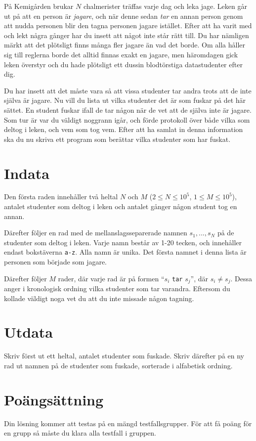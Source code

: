 På Kemigården brukar $N$ chalmerister träffas varje dag och leka jage.
Leken går ut på att en person är \emph{jagare}, 
och när denne sedan \emph{tar} en annan person genom att nudda personen blir den tagna personen jagare istället.
Efter att ha varit med och lekt några gånger har du insett att något inte står rätt till.
Du har nämligen märkt att det plötsligt finns många fler jagare än vad det borde.
Om alla håller sig till reglerna borde det alltid finnas exakt en jagare,
men häromdagen gick leken överstyr och du hade plötsligt ett dussin blodtörstiga datastudenter efter dig.

Du har insett att det måste vara så att vissa studenter tar andra trots att de inte själva är jagare.
Nu vill du lista ut vilka studenter det är som fuskar på det här sättet.
En student fuskar ifall de tar någon när de vet att de själva inte är jagare.
Som tur är var du väldigt noggrann igår, och förde protokoll över både vilka som deltog i leken, och vem som tog vem.
Efter att ha samlat in denna information ska du nu skriva ett program som berättar vilka studenter som har fuskat.

\section*{Indata}
Den första raden innehåller två heltal $N$ och $M$ ($2 \leq N \leq 10^5$, $1 \leq M \leq 10^5$), 
antalet studenter som deltog i leken
och antalet gånger någon student tog en annan.

Därefter följer en rad med de mellanslagsseparerade namnen $s_1, ..., s_N$ på de studenter som deltog i leken.
Varje namn består av 1-20 tecken, och innehåller endast bokstäverna \texttt{a-z}. 
Alla namn är unika.
Det första namnet i denna lista är personen som började som jagare.

Därefter följer $M$ rader, där varje rad är på formen ``$s_i$ \texttt{tar} $s_j$'', där $s_i \neq s_j$.
Dessa anger i kronologisk ordning vilka studenter som tar varandra.
Eftersom du kollade väldigt noga vet du att du inte missade någon tagning.

\section*{Utdata}
Skriv först ut ett heltal, antalet studenter som fuskade.
Skriv därefter på en ny rad ut namnen på de studenter som fuskade, 
sorterade i alfabetisk ordning.

\section*{Poängsättning}
Din lösning kommer att testas på en mängd testfallsgrupper.
För att få poäng för en grupp så måste du klara alla testfall i gruppen.


